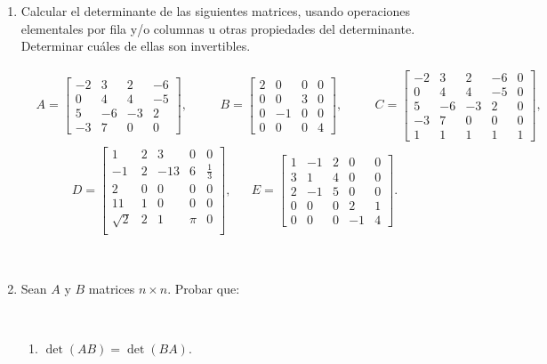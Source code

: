 \documentclass[a4paper,12pt,twoside,spanish,reqno]{amsbook}
\numberwithin{equation}{section}
\begin{document}
\begin{enumerate}
\

\item Calcular el determinante de las siguientes matrices, usando operaciones elementales por fila y/o columnas u otras propiedades del determinante. Determinar cuáles de ellas son invertibles.

\begin{align*}
&A=
\begin{bmatrix}
-2&3&2&-6\\ 0&4&4&-5\\ 5&-6&-3&2\\ -3&7&0&0 \end{bmatrix},\quad
&&B=\begin{bmatrix} 2&0&0&0\\ 0&0&3&0\\ 0&-1&0&0\\ 0&0&0&4\end{bmatrix},\quad
&&
C=\begin{bmatrix}
  -2&3&2&-6&0\\
0&4&4&-5&0\\
5&-6&-3&2&0\\
-3&7&0&0&0\\
1&1&1&1&1
  \end{bmatrix},
\end{align*}
\begin{align*}
D=\begin{bmatrix}
1&2&3&0&0\\
-1&2&-13&6&\frac{1}{3}\\
2&0&0&0&0\\
11&1&0&0&0\\
\sqrt{2}&2&1&\pi&0\\
\end{bmatrix},&&
E=\begin{bmatrix}
1&-1&2&0&0\\ 3&1&4&0&0\\ 2&-1&5&0&0 \\0&0&0&2&1\\ 0&0&0&-1&4
\end{bmatrix}.
\end{align*}


\

\item Sean $A$ y  $B$ matrices $n \times n$. Probar que:

\

\begin{enumerate}
	\item $\det(AB) = \det (BA)$.
	

\end{enumerate}
\end{enumerate}
\end{document}
